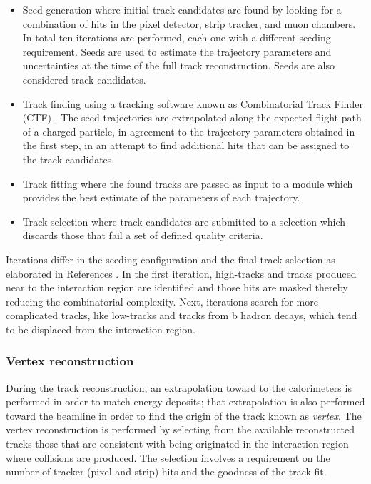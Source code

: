 \begin{itemize}
\item Seed generation where initial track candidates are found by looking for a combination of hits in the pixel detector, strip tracker, and muon chambers. In total ten iterations are performed, each one with a different seeding requirement. Seeds are used to estimate the trajectory parameters and uncertainties at the time of the full track reconstruction. Seeds are also considered track candidates.    
\item Track finding using a tracking software known as Combinatorial Track Finder (CTF) \cite{ctf}. The seed trajectories are extrapolated along the expected flight path of a charged particle, in agreement to the trajectory parameters obtained in the first step, in an attempt to find additional hits that can be assigned to the track candidates. 
\item Track fitting where the found tracks are passed as input to a module which provides the best estimate of the parameters of each trajectory.
\item Track selection where track candidates are submitted to a selection which discards those that fail a set of defined quality criteria.
\end{itemize}

Iterations differ in the seeding configuration and the final track selection as elaborated in References \cite{particle_flow, particle_flow2}. In the first iteration, high-\pt tracks and tracks produced near to the interaction region are identified and those hits are masked thereby reducing the combinatorial complexity. Next, iterations search for more complicated tracks, like low-\pt tracks and tracks from b hadron decays, which tend to be displaced from the interaction region.

\subsubsection*{Vertex reconstruction}

During the track reconstruction, an extrapolation toward to the calorimeters is performed in order to match energy deposits; that extrapolation is also performed toward the beamline in order to find the origin of the track known as \textit{vertex}. The vertex reconstruction is performed by selecting from the available reconstructed tracks those that are consistent with being originated in the interaction region where \pp collisions are produced. The selection involves a requirement on the number of tracker (pixel and strip) hits and the goodness of the track fit.

